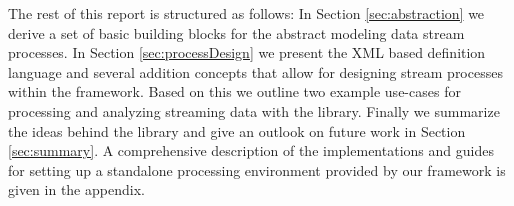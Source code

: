 The rest of this report is structured as follows: In Section
\ref{sec:abstraction} we derive a set of basic building blocks for the
abstract modeling data stream processes. In Section
\ref{sec:processDesign} we present the XML based definition language
and several addition concepts that allow for designing stream
processes within the framework. Based on this we outline two example
use-cases for processing and analyzing streaming data with the
\streams library. Finally we summarize the ideas behind the \streams
library and give an outlook on future work in Section
\ref{sec:summary}. A comprehensive description of the implementations
and guides for setting up a standalone processing environment provided
by our framework is given in the appendix.
